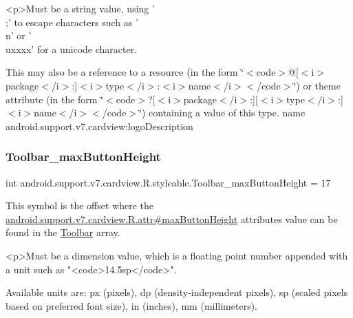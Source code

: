\begin{DoxyVerb}      <p>Must be a string value, using '\\;' to escape characters such as '\\n' or '\\uxxxx' for a unicode character.
\end{DoxyVerb}
 

This may also be a reference to a resource (in the form \char`\"{}$<$code$>$@\mbox{[}$<$i$>$package$<$/i$>$\+:\mbox{]}$<$i$>$type$<$/i$>$\+:$<$i$>$name$<$/i$>$$<$/code$>$\char`\"{}) or theme attribute (in the form \char`\"{}$<$code$>$?\mbox{[}$<$i$>$package$<$/i$>$\+:\mbox{]}\mbox{[}$<$i$>$type$<$/i$>$\+:\mbox{]}$<$i$>$name$<$/i$>$$<$/code$>$\char`\"{}) containing a value of this type.  name android.\+support.\+v7.\+cardview\+:logo\+Description \mbox{\label{classandroid_1_1support_1_1v7_1_1cardview_1_1R_1_1styleable_a26e906d28bad0693208a7f57617b8316}} 
\subsubsection{\texorpdfstring{Toolbar\+\_\+max\+Button\+Height}{Toolbar\_maxButtonHeight}}
{\footnotesize\ttfamily int android.\+support.\+v7.\+cardview.\+R.\+styleable.\+Toolbar\+\_\+max\+Button\+Height = 17\hspace{0.3cm}{\ttfamily [static]}}

This symbol is the offset where the \hyperlink{classandroid_1_1support_1_1v7_1_1cardview_1_1R_1_1attr_ac1e386294c7f266fd78e00b818be9a3d}{android.\+support.\+v7.\+cardview.\+R.\+attr\#max\+Button\+Height} attribute\textquotesingle{}s value can be found in the \hyperlink{classandroid_1_1support_1_1v7_1_1cardview_1_1R_1_1styleable_a26149aeb8fd339abe09ecc9d92b9304f}{Toolbar} array.

\begin{DoxyVerb}      <p>Must be a dimension value, which is a floating point number appended with a unit such as "<code>14.5sp</code>".
\end{DoxyVerb}
 Available units are\+: px (pixels), dp (density-\/independent pixels), sp (scaled pixels based on preferred font size), in (inches), mm (millimeters). 

